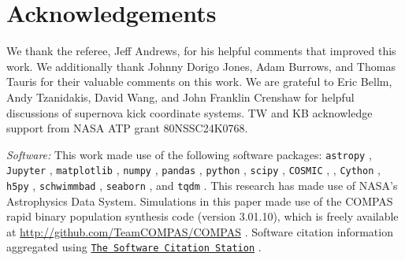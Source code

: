 \documentclass[apj,twocolumn]{openjournal}
\newcommand{\referee}[1]{#1}
\begin{document}
\section*{Acknowledgements}
\referee{We thank the referee, Jeff Andrews, for his helpful comments that improved this work. We additionally thank Johnny Dorigo Jones, Adam Burrows, and Thomas Tauris for their valuable comments on this work.} We are grateful to Eric Bellm, Andy Tzanidakis, David Wang, and John Franklin Crenshaw for helpful discussions of supernova kick coordinate systems. TW and KB acknowledge support from NASA ATP grant 80NSSC24K0768.

\textit{Software:} This work made use of the following software packages: \texttt{astropy} \citep{astropy:2013, astropy:2018, astropy:2022}, \texttt{Jupyter} \citep{2007CSE.....9c..21P, kluyver2016jupyter}, \texttt{matplotlib} \citep{Hunter:2007}, \texttt{numpy} \citep{numpy}, \texttt{pandas} \citep{mckinney-proc-scipy-2010, pandas_13819579}, \texttt{python} \citep{python}, \texttt{scipy} \citep{2020SciPy-NMeth, scipy_13352243}, \texttt{COSMIC} \citep{Breivik2020, COSMIC_13854578}, \binc \citep{Izzard+2004:2004MNRAS.350..407I, Izzard+2006:2006A&A...460..565I, Izzard+2009:2009A&A...508.1359I, Izzard+2018:2018MNRAS.473.2984I, Izzard+2023:2023MNRAS.521...35I, Hendriks+2023:2023JOSS....8.4642H}, \texttt{Cython} \citep{cython:2011}, \texttt{h5py} \citep{collette_python_hdf5_2014, h5py_7560547}, \texttt{schwimmbad} \citep{schwimmbad}, \texttt{seaborn} \citep{Waskom2021}, and \texttt{tqdm} \citep{tqdm_13207611}. This research has made use of NASA's Astrophysics Data System. Simulations in this paper made use of the COMPAS rapid binary population synthesis code (version 3.01.10), which is freely available at \url{http://github.com/TeamCOMPAS/COMPAS} \citep{COMPAS}. Software citation information aggregated using \texttt{\href{https://www.tomwagg.com/software-citation-station/}{The Software Citation Station}} \citep{software-citation-station-paper, software-citation-station-zenodo}.



{}
\end{document}
